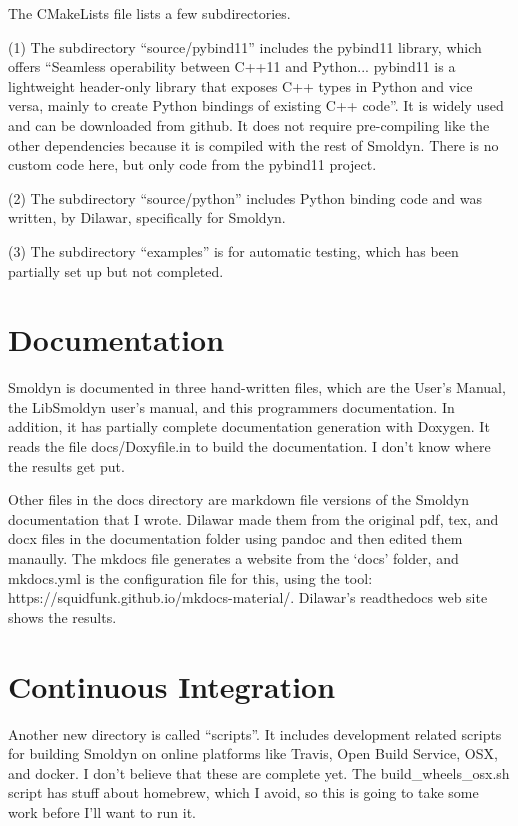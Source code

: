 \documentclass {book}
\begin{document}
The CMakeLists file lists a few subdirectories.

(1) The subdirectory ``source/pybind11'' includes the pybind11 library, which offers ``Seamless operability between C++11 and Python... pybind11 is a lightweight header-only library that exposes C++ types in Python and vice versa, mainly to create Python bindings of existing C++ code''. It is widely used and can be downloaded from github. It does not require pre-compiling like the other dependencies because it is compiled with the rest of Smoldyn. There is no custom code here, but only code from the pybind11 project.

(2) The subdirectory ``source/python'' includes Python binding code and was written, by Dilawar, specifically for Smoldyn.

(3) The subdirectory ``examples'' is for automatic testing, which has been partially set up but not completed.

\section{Documentation}

Smoldyn is documented in three hand-written files, which are the User's Manual, the LibSmoldyn user's manual, and this programmers documentation. In addition, it has partially complete documentation generation with Doxygen. It reads the file docs/Doxyfile.in to build the documentation. I don't know where the results get put.

Other files in the docs directory are markdown file versions of the Smoldyn documentation that I wrote. Dilawar made them from the original pdf, tex, and docx files in the documentation folder using pandoc and then edited them manaully. The mkdocs file generates a website from the `docs' folder, and mkdocs.yml is the configuration file for this, using the tool: https://squidfunk.github.io/mkdocs-material/. Dilawar's readthedocs web site shows the results.

\section{Continuous Integration}

Another new directory is called ``scripts''. It includes development related scripts for building Smoldyn on online platforms like Travis, Open Build Service, OSX, and docker. I don't believe that these are complete yet. The build\_wheels\_osx.sh script has stuff about homebrew, which I avoid, so this is going to take some work before I'll want to run it.
\end{document}
